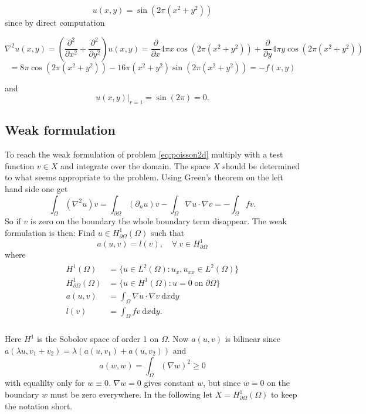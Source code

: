 \documentclass[paper=a4, fontsize=11pt]{scrartcl} %
\begin{document}
\begin{equation}
u(x,y)=\sin\left(2\pi(x^2+y^2)\right)
\label{eq:poisson2danal}
\end{equation}
since by direct computation

\[\nabla^2u(x,y) = \left( \frac{\partial^2}{\partial x^2} + \frac{\partial^2}{\partial y^2} \right) u(x,y) = \frac{\partial}{\partial x} 4\pi x\cos\left(2\pi(x^2+y^2)\right) + \frac{\partial}{\partial y} 4\pi y\cos\left(2\pi(x^2+y^2)\right)
\]\[= 8\pi\cos\left(2\pi(x^2+y^2)\right) -16\pi(x^2+y^2)\sin\left(2\pi(x^2+y^2)\right) = -f(x,y)\]

and \[u(x,y)|_{r=1}=\sin(2\pi)=0.\]

\subsection{Weak formulation}
To reach the weak formulation of problem \eqref{eq:poisson2d} multiply with a test function $v\in X$ and integrate over the domain. The space $X$ should be determined to what seems appropriate to the problem. Using Green's theorem on the left hand side one get 
\[\int_{\Omega}  (\nabla^2u)v = \int_{\partial\Omega} (\partial_n u) v -\int_{\Omega} \nabla u \cdot \nabla v = -\int_{\Omega} f v.\]
So if $v$ is zero on the boundary the whole boundary term disappear. The weak formulation is then: Find $u\in H^1_{\partial\Omega}(\Omega)$ such that
\[a(u,v) = l(v), \quad \forall \: v \in H^1_{\partial\Omega}\]
where 
\begin{eqnarray}
\begin{aligned}
H^1(\Omega) &= \{u \in L^2(\Omega) : u_x, u_{xx} \in L^2(\Omega)\} \\
H^1_{\partial\Omega}(\Omega) &= \{u\in H^1(\Omega) : u=0 \; \mathrm{on} \;  \partial\Omega\} \\
a(u,v) &= \int_{\Omega} \nabla u\cdot\nabla v \: \mathrm{d}x\mathrm{d}y\\
l(v) &= \int_{\Omega} f v \: \mathrm{d}x\mathrm{d}y.\\
\end{aligned}
\label{eq:poisson2d:Weak}
\end{eqnarray}

Here $H^1$ is the Sobolov space of order 1 on $\Omega$. Now $a(u,v)$ is bilinear since $a(\lambda u,v_1+v_2)=\lambda\left(a(u,v_1)+a(u,v_2)\right)$ and
\[a(w,w)=\int_{\Omega} (\nabla w)^2 \geq 0\] 
with equalilty only for $w\equiv 0$. $\nabla w=0$ gives constant $w$, but since $w=0$ on the boundary $w$ must be zero everywhere. In the following let $X=H^1_{\partial\Omega}(\Omega)$ to keep the notation short.
\end{document}
